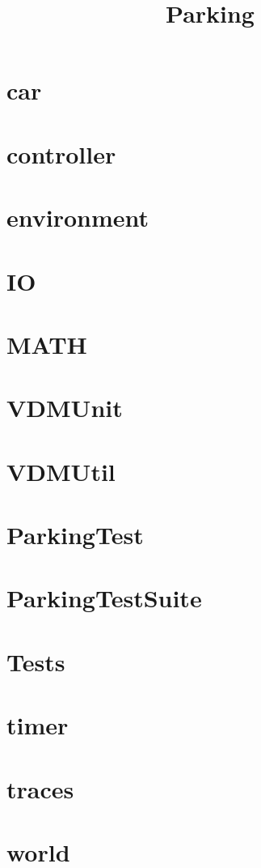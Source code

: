 \documentclass{article}
\begin{document}
\title{Parking}
\author{}
\maketitle
\tableofcontents

\section{car}


\section{controller}


\section{environment}


\section{IO}


\section{MATH}


\section{VDMUnit}


\section{VDMUtil}


\section{ParkingTest}


\section{ParkingTestSuite}


\section{Tests}


\section{timer}


\section{traces}


\section{world}

\end{document}
